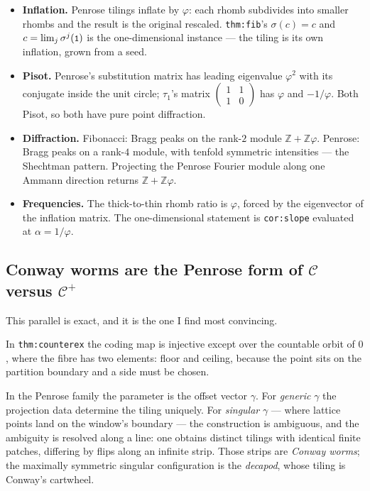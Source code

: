 \documentclass[11pt,a4paper]{article}
\newcommand{\seq}[1]{\texttt{\small #1}}
\newcommand{\C}{\mathcal{C}}
\newcommand{\Cp}{\mathcal{C}^{+}}
\newcommand{\Z}{\mathbb{Z}}
\theoremstyle{definition}
\theoremstyle{plain}
\begin{document}
\begin{itemize}
\item \textbf{Inflation.} Penrose tilings inflate by $\varphi$: each rhomb
  subdivides into smaller rhombs and the result is the original rescaled.
  \texttt{thm:fib}'s $\sigma(c) = c$ and $c = \lim_j \sigma^j(\seq{1})$ is the
  one-dimensional instance --- the tiling is its own inflation, grown from a
  seed.
\item \textbf{Pisot.} Penrose's substitution matrix has leading eigenvalue
  $\varphi^2$ with its conjugate inside the unit circle; $\tau_1$'s matrix
  $\left(\begin{smallmatrix}1&1\\1&0\end{smallmatrix}\right)$ has $\varphi$
  and $-1/\varphi$. Both Pisot, so both have pure point diffraction.
\item \textbf{Diffraction.} Fibonacci: Bragg peaks on the rank-$2$ module
  $\Z + \Z\varphi$. Penrose: Bragg peaks on a rank-$4$ module, with tenfold
  symmetric intensities --- the Shechtman pattern. Projecting the Penrose
  Fourier module along one Ammann direction returns $\Z + \Z\varphi$.
\item \textbf{Frequencies.} The thick-to-thin rhomb ratio is $\varphi$, forced
  by the eigenvector of the inflation matrix. The one-dimensional statement is
  \texttt{cor:slope} evaluated at $\alpha = 1/\varphi$.
\end{itemize}

\subsection{Conway worms are the Penrose form of $\C$ versus $\Cp$}

This parallel is exact, and it is the one I find most convincing.

In \texttt{thm:counterex} the coding map is injective except over the countable
orbit of $0$, where the fibre has two elements: floor and ceiling, because the
point sits on the partition boundary and a side must be chosen.

In the Penrose family the parameter is the offset vector $\gamma$. For
\emph{generic} $\gamma$ the projection data determine the tiling uniquely. For
\emph{singular} $\gamma$ --- where lattice points land on the window's boundary
--- the construction is ambiguous, and the ambiguity is resolved along a line:
one obtains distinct tilings with identical finite patches, differing by flips
along an infinite strip. Those strips are \emph{Conway worms}; the maximally
symmetric singular configuration is the \emph{decapod}, whose tiling is Conway's
cartwheel.
\end{document}

